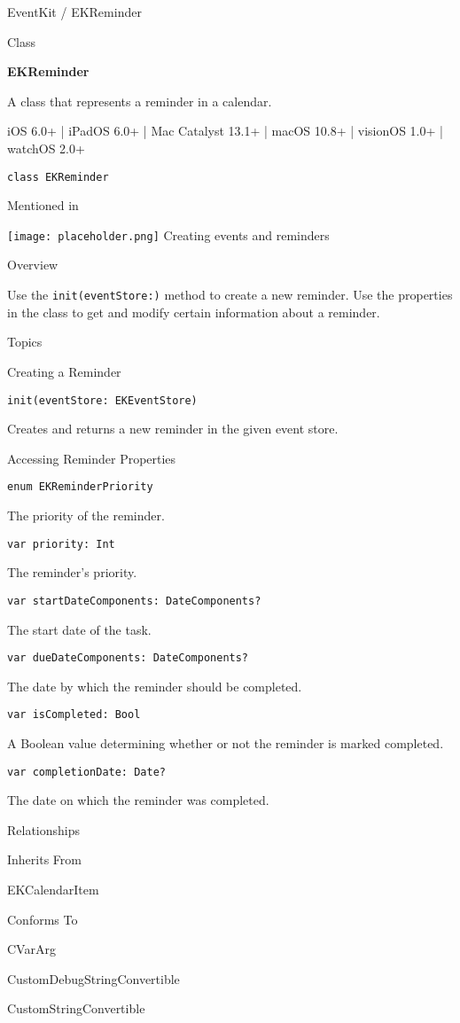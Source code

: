 \documentclass{article}
\title{}
\author{}
\date{}
\begin{document}
EventKit / EKReminder

Class

\textbf{EKReminder}

A class that represents a reminder in a calendar.

iOS 6.0+ | iPadOS 6.0+ | Mac Catalyst 13.1+ | macOS 10.8+ | visionOS 1.0+ | watchOS 2.0+

\texttt{class EKReminder}

Mentioned in

\texttt{[image: placeholder.png]} Creating events and reminders

Overview

Use the \texttt{init(eventStore:)} method to create a new reminder. Use the properties in the class to get and modify certain information about a reminder.

Topics

Creating a Reminder

\texttt{init(eventStore: EKEventStore)}

Creates and returns a new reminder in the given event store.

Accessing Reminder Properties

\texttt{enum EKReminderPriority}

The priority of the reminder.

\texttt{var priority: Int}

The reminder's priority.

\texttt{var startDateComponents: DateComponents?}

The start date of the task.

\texttt{var dueDateComponents: DateComponents?}

The date by which the reminder should be completed.

\texttt{var isCompleted: Bool}

A Boolean value determining whether or not the reminder is marked completed.

\texttt{var completionDate: Date?}

The date on which the reminder was completed.

Relationships

Inherits From

EKCalendarItem

Conforms To

CVarArg

CustomDebugStringConvertible

CustomStringConvertible
\end{document}
